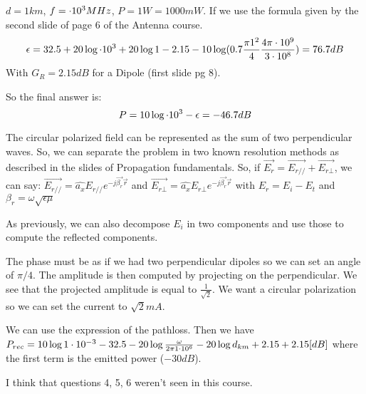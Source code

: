 \begin{solution}
	$d = 1km$, $f = \cdot 10^{3} MHz$, $P = 1W = 1000 mW$.
	If we use the formula given by the second slide of page 6 of the Antenna course.
	$$\epsilon = 32.5 + 20 \log \cdot 10^{3} + 20 \log 1 - 2.15 - 10\log (0.7\frac{\pi 1^2}{4}\frac{4\pi \cdot 10^{9}}{3 \cdot 10^{8}}) = 76.7dB$$
	With $G_R = 2.15 dB$ for a Dipole (first slide pg 8).  
	
	So the final answer is:
	$$P = 10 \log \cdot 10^{3} - \epsilon = -46.7dB$$
\end{solution}

\nosolution

\begin{solution}
	The circular polarized field can be represented as the sum of two perpendicular waves. So, we can separate the problem in two known resolution methods as described in the slides of Propagation fundamentals.
	So, if $\vec{E_{r}} = \vec{E_{r//}} + \vec{E_{r\bot}}$, we can say:
	$\vec{E_{r//}} = \hat{a_x}E_{r//} e^{-j\vec{\beta_r}\vec{r}}$ and $\vec{E_{r\bot}} = \hat{a_x}E_{r\bot}e^{-j\vec{\beta_r}\vec{r}}$ with $E_r = E_i - E_t$ and $\beta_r = \omega\sqrt{\epsilon \mu}$	
	
	
	As previously, we can also decompose $E_i$ in two components and use those to compute the reflected components.
\end{solution}

\begin{solution}
	The phase must be as if we had two perpendicular dipoles so we can set an angle of $\pi/4$. The amplitude is then computed by projecting on the perpendicular. We see that the projected amplitude is equal to $\frac{1}{\sqrt{2}}$. We want a circular polarization so we can set the current to $\sqrt{2} mA$.
	
	We can use the expression of the pathloss. Then we have $P_{rec} = 10\log{1\cdot 10^{-3}} - 32.5 - 20\log \frac{\omega}{2\pi 1\cdot 10^{6}} - 20 \log d_{km} + 2.15 + 2.15 [dB]$ where the first term is the emitted power ($-30dB$). \notsure
\end{solution}

I think that questions 4, 5, 6 weren't seen in this course. \notsure
